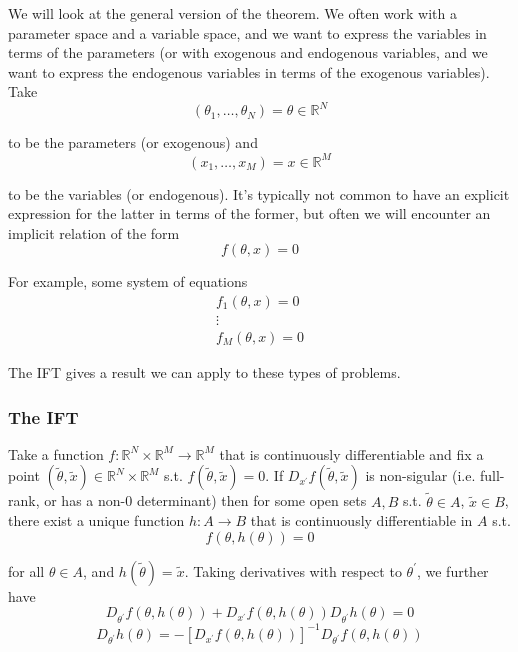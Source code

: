 \documentclass{article}
\begin{document}
We will look at the general version of the theorem. We often work with a parameter space and a variable space, and we  want to express the variables in terms of the parameters (or with exogenous and endogenous variables, and we want to express the endogenous variables in terms of the exogenous variables). Take
\[
  (\theta_1, \ldots, \theta_N) = \theta \in \mathbb{R}^N
\]

to be the parameters (or exogenous) and
\[
  (x_1, \ldots, x_M) = x \in \mathbb{R}^M
\]

to be the variables (or endogenous). It's typically not common to have an explicit expression for the latter in terms of the former, but often we will encounter an implicit relation of the form
\[
  f(\theta, x) = 0
\]

For example, some system of equations
\begin{equation}
  \begin{array}{c}
    f_1(\theta, x) = 0 \\
    \vdots \\
    f_M(\theta, x) = 0
  \end{array}
  \nonumber
\end{equation}

The IFT gives a result we can apply to these types of problems.

\subsubsection{The IFT}
\label{ssub:the_ift}

\begin{theorem}
  Take a function $f: \mathbb{R}^N \times \mathbb{R}^M \to \mathbb{R}^M$ that is continuously differentiable and fix a point $(\widetilde{\theta}, \widetilde{x}) \in \mathbb{R}^N \times \mathbb{R}^M$ s.t. $f(\widetilde{\theta}, \widetilde{x}) = 0$. If $D_{x^\prime} f(\widetilde{\theta}, \widetilde{x})$ is non-sigular (i.e. full-rank, or has a non-0 determinant) then for some open sets $A, B$ s.t. $\widetilde{\theta} \in A$, $\widetilde{x} \in B$, there exist a unique function $h: A \to B$ that is continuously differentiable in $A$ s.t.
  \[
    f(\theta, h(\theta)) = 0
  \]

  for all $\theta \in A$, and $h(\widetilde{\theta}) = \widetilde{x}$. Taking derivatives with respect to $\theta^\prime$, we further have
  \[
    D_{\theta^\prime} f(\theta, h(\theta)) + D_{x^\prime} f(\theta, h(\theta)) D_{\theta^\prime} h(\theta) = 0
  \]
  \[
    D_{\theta^\prime} h(\theta) = - \left[D_{x^\prime} f(\theta, h(\theta))\right]^{-1} D_{\theta^\prime} f(\theta, h(\theta))
  \]
\end{theorem}
\end{document}

